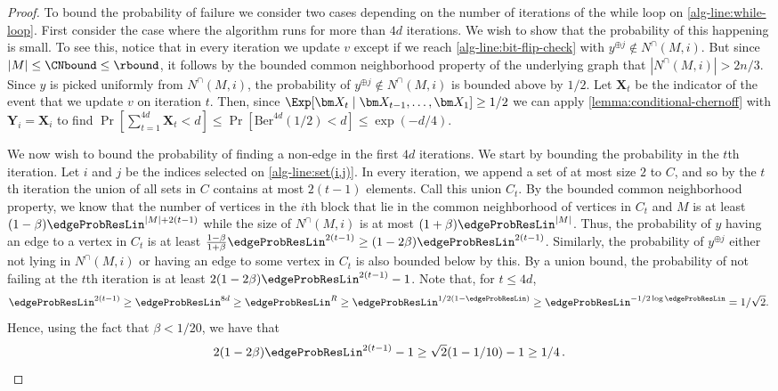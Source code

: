 {}{
\begin{proof}
    To bound the probability of failure we consider two cases depending on the number of iterations of the while loop on \autoref{alg-line:while-loop}. First consider the case where the algorithm runs for more than $4d$ iterations. We wish to show that the probability of this happening is small. To see this,  notice that in every iteration we update $v$ except if we reach \autoref{alg-line:bit-flip-check} with $y^{\oplus j}\notin N^\cap(M,i)$. But since $|M|\leq \CNbound\leq \rbound$, it follows by the bounded common neighborhood property of the underlying graph  that $|N^\cap(M,i)| > 2n/3$. Since $y$ is picked uniformly from $N^\cap(M,i)$, the probability of $y^{\oplus j}\notin N^\cap(M,i)$ is bounded above by $1/2$. Let $\bm X_t$ be the indicator of the event that we update $v$ on iteration $t$. Then, since $\Exp [\bm X_t \mid \bm X_{t-1},\dots, \bm X_1] \geq 1/2$ we can apply \autoref{lemma:conditional-chernoff} with $\bm Y_i = \bm X_i$ to find $\Pr[\sum_{t=1}^{4d}\bm X_t<d] \leq \Pr[\mathrm{Ber}^{4d}(1/2)<d] \leq \exp(-d/4)$. 
    
    We now wish to bound the probability of finding a non-edge in the first $4d$ iterations. We start by bounding the probability in the $t$th iteration. Let $i$ and $j$ be the indices selected on \autoref{alg-line:set(i,j)}. In every iteration, we append a set of at most size $2$ to $C$, and so by the $t$th iteration the union of all sets in $C$ contains at most $2(t-1)$ elements. Call this union $C_t$. By the bounded common neighborhood property, we know that the number of vertices in the $i$th block that lie in the common neighborhood of vertices in $C_t$ and $M$ is at least $(1-\beta)\edgeProbResLin^{|M|+2(t-1)}$ while the size of $N^\cap(M,i)$ is at most $(1+\beta)\edgeProbResLin^{|M|}$. 
    Thus, the probability of $y$ having an edge to a vertex in $C_t$ is at least $\frac{1-\beta}{1+\beta}\edgeProbResLin^{2(t-1)}\geq(1-2\beta)\edgeProbResLin^{2(t-1)}$. Similarly, the probability of $y^{\oplus j}$ either not lying in $N^\cap(M,i)$ or having an edge to some vertex in $C_t$ is also bounded below by this. By a union bound, the probability of not failing at the $t$th iteration is at least $2(1-2\beta)\edgeProbResLin^{2(t-1)}-1$. Note that, for $t\leq4d$, 
    \begin{equation*}
    \edgeProbResLin^{2(t-1)}\geq \edgeProbResLin^{8d}\geq \edgeProbResLin ^R\geq \edgeProbResLin^{1/2(1-\edgeProbResLin)} \geq \edgeProbResLin^{-1/2\log \edgeProbResLin} = 1/\sqrt 2. \,
    \end{equation*} 
    Hence, using the fact that $\beta <1/20$, we have that
    \begin{equation*}
        2(1-2\beta)\edgeProbResLin^{2(t-1)}-1 \geq \sqrt2(1-1/10)-1\geq 1/4 \,.
    \end{equation*}
 

\end{proof}}
